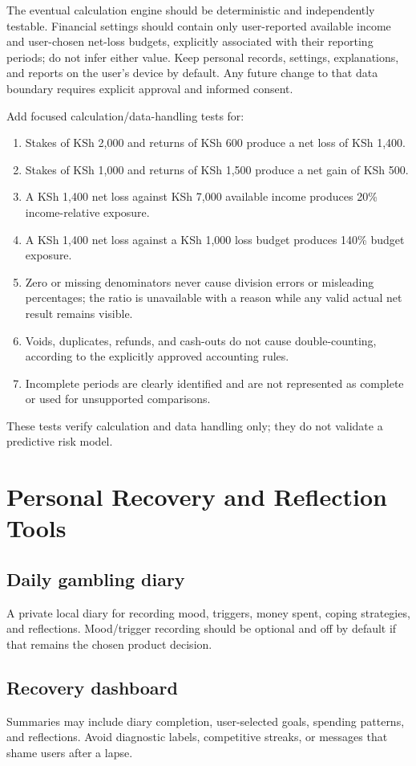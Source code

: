 \documentclass[11pt,a4paper]{article}
\begin{document}
The eventual calculation engine should be deterministic and independently testable. Financial settings should contain only user-reported available income and user-chosen net-loss budgets, explicitly associated with their reporting periods; do not infer either value. Keep personal records, settings, explanations, and reports on the user's device by default. Any future change to that data boundary requires explicit approval and informed consent.

Add focused calculation/data-handling tests for:
\begin{enumerate}
  \item Stakes of KSh 2,000 and returns of KSh 600 produce a net loss of KSh 1,400.
  \item Stakes of KSh 1,000 and returns of KSh 1,500 produce a net gain of KSh 500.
  \item A KSh 1,400 net loss against KSh 7,000 available income produces 20\% income-relative exposure.
  \item A KSh 1,400 net loss against a KSh 1,000 loss budget produces 140\% budget exposure.
  \item Zero or missing denominators never cause division errors or misleading percentages; the ratio is unavailable with a reason while any valid actual net result remains visible.
  \item Voids, duplicates, refunds, and cash-outs do not cause double-counting, according to the explicitly approved accounting rules.
  \item Incomplete periods are clearly identified and are not represented as complete or used for unsupported comparisons.
\end{enumerate}
These tests verify calculation and data handling only; they do not validate a predictive risk model.

\section{Personal Recovery and Reflection Tools}

\subsection{Daily gambling diary}
A private local diary for recording mood, triggers, money spent, coping strategies, and reflections. Mood/trigger recording should be optional and off by default if that remains the chosen product decision.

\subsection{Recovery dashboard}
Summaries may include diary completion, user-selected goals, spending patterns, and reflections. Avoid diagnostic labels, competitive streaks, or messages that shame users after a lapse.
\end{document}
